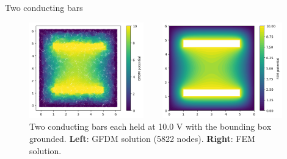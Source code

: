 \documentclass{beamer}
\begin{document}
\begin{frame}{Two conducting bars}
\begin{figure}[h]
\begin{columns}
    \begin{column}{0.5\linewidth}
        \includegraphics[width=0.95\textwidth]{Figures/Bars_GFDM.png}
    \end{column}
    \begin{column}{0.5\linewidth}
        \includegraphics[width=0.95\textwidth]{Figures/Bars_FEM.png}
    \end{column}
\end{columns}
\caption{Two conducting bars each held at 10.0 V with the bounding box grounded. \textbf{Left}: GFDM solution (5822 nodes). \textbf{Right}: FEM solution.}
\label{fig:two_bars}
\end{figure}
\end{frame}
\end{document}

